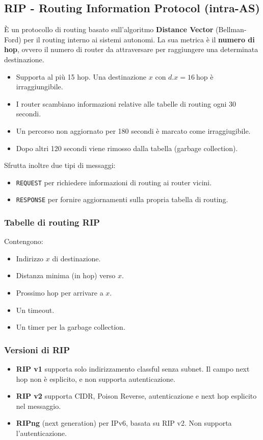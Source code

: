 \subsection{RIP - Routing Information Protocol (intra-AS)}
È un protocollo di routing basato sull'algoritmo \textbf{Distance Vector} (Bellman-Ford) per il routing interno ai sistemi autonomi. La sua metrica è il \textbf{numero di hop}, ovvero il numero di router da attraversare per raggiungere una determinata destinazione.
\begin{itemize}
	\item Supporta al più 15 hop. Una destinazione $x$ con $d.x=16 \ \text{hop}$ è irraggiungibile.
	\item I router scambiano informazioni relative alle tabelle di routing ogni 30 secondi.
	\item Un percorso non aggiornato per 180 secondi è marcato come irraggiugibile.
	\item Dopo altri 120 secondi viene rimosso dalla tabella (garbage collection).
\end{itemize}
Sfrutta inoltre due tipi di messaggi:
\begin{itemize}
	\item \verb|REQUEST| per richiedere informazioni di routing ai router vicini.
	\item \verb|RESPONSE| per fornire aggiornamenti sulla propria tabella di routing.
\end{itemize}
\subsubsection{Tabelle di routing RIP}
Contengono:
\begin{itemize}
	\item Indirizzo $x$ di destinazione.
	\item Distanza minima (in hop) verso $x$.
	\item Prossimo hop per arrivare a $x$.
	\item Un timeout.
	\item Un timer per la garbage collection.
\end{itemize}

\subsubsection{Versioni di RIP}
\begin{itemize}
	\item \textbf{RIP v1} supporta solo indirizzamento classful senza subnet. Il campo next hop non è esplicito, e non supporta autenticazione.
	\item \textbf{RIP v2} supporta CIDR, Poison Reverse, autenticazione e next hop esplicito nel messaggio.
	\item \textbf{RIPng} (next generation) per IPv6, basata su RIP v2. Non supporta l'autenticazione.
\end{itemize}

